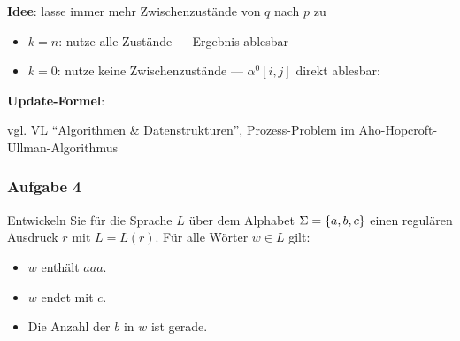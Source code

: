 \documentclass{beamer}
\begin{document}
	\begin{frame}
		\small
		\textbf{Idee}: lasse immer mehr Zwischenzustände von $q$ nach $p$ zu \\
		\begin{itemize}
			\item $k = n$: nutze alle Zustände --- Ergebnis ablesbar
			\item $k = 0$: nutze keine Zwischenzustände --- $\alpha^0[i,j]$ direkt ablesbar:
		\end{itemize}
	
		\textbf{Update-Formel}:
	
		\begin{itshape}
			\scriptsize
			vgl. VL \enquote{Algorithmen \& Datenstrukturen}, Prozess-Problem im Aho-Hopcroft-Ullman-Algorithmus
		\end{itshape}
	\end{frame}

	\begin{frame} \frametitle{Aufgabe 4}
		\small
		Entwickeln Sie für die Sprache $L$ über dem Alphabet $\Sigma = \left\{ a, b, c \right\}$ einen regulären Ausdruck $r$ mit $L = L(r)$. Für alle Wörter $w \in L$ gilt:
		\begin{itemize}
			\item $w$ enthält $aaa$.
			\item $w$ endet mit $c$.
			\item Die Anzahl der $b$ in $w$ ist gerade.
		\end{itemize}
	\end{frame}
\end{document}
